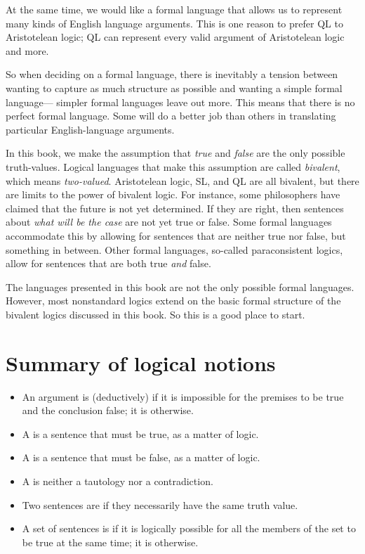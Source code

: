 At the same time, we would like a formal language that allows us to represent many kinds of English language arguments. This is one reason to prefer QL to Aristotelean logic; QL can represent every valid argument of Aristotelean logic and more.

So when deciding on a formal language, there is inevitably a tension between wanting to capture as much structure as possible and wanting a simple formal language--- simpler formal languages leave out more. This means that there is no perfect formal language. Some will do a better job than others in translating particular English-language arguments.

In this book, we make the assumption that \emph{true} and \emph{false} are the only possible truth-values. Logical languages that make this assumption are called \emph{bivalent}, which means \emph{two-valued}. Aristotelean logic, SL, and QL are all bivalent, but there are limits to the power of bivalent logic. For instance, some philosophers have claimed that the future is not yet determined. If they are right, then sentences about \emph{what will be the case} are not yet true or false.
Some formal languages accommodate this by allowing for sentences that are neither true nor false, but something in between.
Other formal languages, so-called paraconsistent logics, allow for sentences that are both true \emph{and} false.

The languages presented in this book are not the only possible formal languages. However, most nonstandard logics extend on the basic formal structure of the bivalent logics discussed in this book. So this is a good place to start.


\section*{Summary of logical notions}
\begin{itemize}
\item An argument is (deductively)  if it is impossible for the premises to be true and the conclusion false; it is  otherwise.

\item A  is a sentence that must be true, as a matter of logic.

\item A  is a sentence that must be false, as a matter of logic.

\item A  is neither a tautology nor a contradiction.

\item Two sentences are  if they necessarily have the same truth value.

\item A set of sentences is  if it is logically possible for all the members of the set to be true at the same time; it is  otherwise.
\end{itemize}


